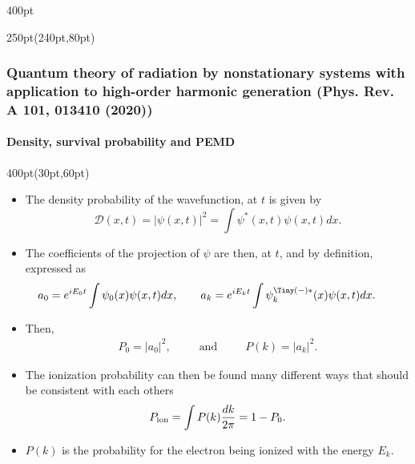\begin{frame}
\begin{textblock*}{400pt}
\end{textblock*}

\begin{textblock*}{250pt}(240pt,80pt)
\end{textblock*}

\end{frame}




\begin{frame}
\frametitle{Quantum theory of radiation by nonstationary systems 
	with application to high-order harmonic generation
        (Phys. Rev. A 101, 013410 (2020))}
	\framesubtitle{Density, survival probability and PEMD}

\begin{textblock*}{400pt}(30pt,60pt)
\footnotesize
\begin{itemize}
\item The density probability of the wavefunction, at $t$ is given by
\begin{equation}
	\mathcal{D}(x,t) = \left|\psi(x,t)\right|^2
	= \int \psi^{*}(x,t)\psi(x,t)dx.
\label{eqn:density}
\end{equation}
\item The coefficients of the projection of ${\psi}$ are then, at $t$,
and by definition, expressed as
\begin{equation}
a_0 = e^{iE_0 t}\int \psi_0(x) \psi(x,t)dx, \hspace{20pt}
a_k = e^{iE_k t}\int \psi_k^{\Tiny (-)*}(x) \psi(x,t)dx. \hspace{20pt}
\label{eqn:a0k}
\end{equation}



\item Then, 
\begin{align}
	P_0  = \left| a_0 \right|^2, 
 \hspace{30pt} \mbox{and}\hspace{30pt} P(k) = \left| a_k \right|^2. 
\end{align}

\item The ionization probability can then be found many different 
ways that should be consistent with each others
\begin{align}
   P_{\rm ion}  = \int P(k)\frac{dk}{2\pi}  = 1-P_0. \label{eqn:pion1}
\end{align}

\item  $P(k)$ is the probability for the electron 
being ionized with the energy $E_k$.

\end{itemize}
\end{textblock*}


\end{frame}



